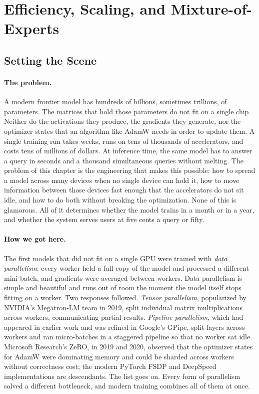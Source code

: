 \section{Efficiency, Scaling, and Mixture-of-Experts}
\label{sec:week6-moe}

\subsection*{Setting the Scene}

\paragraph{The problem.}
A modern frontier model has hundreds of billions, sometimes trillions,
of parameters. The matrices that hold those parameters do not fit on
a single chip. Neither do the activations they produce, the gradients
they generate, nor the optimizer states that an algorithm like AdamW
needs in order to update them. A single training run takes weeks,
runs on tens of thousands of accelerators, and costs tens of millions
of dollars. At inference time, the same model has to answer a query
in seconds and a thousand simultaneous queries without melting. The
problem of this chapter is the engineering that makes this possible:
how to spread a model across many devices when no single device can
hold it, how to move information between those devices fast enough
that the accelerators do not sit idle, and how to do both without
breaking the optimization. None of this is glamorous. All of it
determines whether the model trains in a month or in a year, and
whether the system serves users at five cents a query or fifty.

\paragraph{How we got here.}
The first models that did not fit on a single GPU were trained with
\emph{data parallelism}: every worker held a full copy of the model
and processed a different mini-batch, and gradients were averaged
between workers. Data parallelism is simple and beautiful and runs
out of room the moment the model itself stops fitting on a worker.
Two responses followed. \emph{Tensor parallelism}, popularized by
NVIDIA's Megatron-LM team in 2019, split individual matrix
multiplications across workers, communicating partial results.
\emph{Pipeline parallelism}, which had appeared in earlier work and
was refined in Google's GPipe, split layers across workers and ran
micro-batches in a staggered pipeline so that no worker sat idle.
Microsoft Research's ZeRO, in 2019 and 2020, observed that the
optimizer states for AdamW were dominating memory and could be
sharded across workers without correctness cost; the modern PyTorch
FSDP and DeepSpeed implementations are descendants. The list goes on.
Every form of parallelism solved a different bottleneck, and modern
training combines all of them at once.

